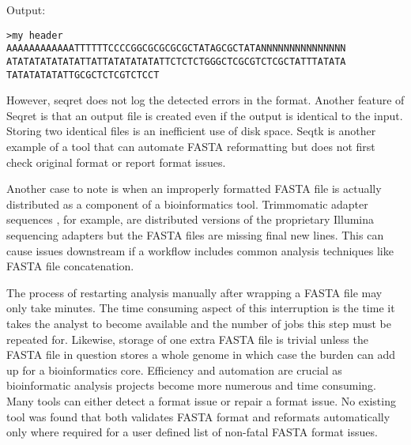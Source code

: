 Output:

\begin{verbatim}
>my header
AAAAAAAAAAAATTTTTTCCCCGGCGCGCGCGCTATAGCGCTATANNNNNNNNNNNNNNN
ATATATATATATATTATTATATATATATTCTCTCTGGGCTCGCGTCTCGCTATTTATATA
TATATATATATTGCGCTCTCGTCTCCT
\end{verbatim}

However, seqret does not log the detected errors in the format. Another feature of Seqret is that an output file is created even if the output is identical to the input. Storing two identical files is an inefficient use of disk space. Seqtk \cite{Li2013} is another example of a tool that can automate FASTA reformatting but does not first check original format or report format issues. 

Another case to note is when an improperly formatted FASTA file is actually distributed as a component of a bioinformatics tool. Trimmomatic adapter sequences \cite{bolger2014trimmomatic}, for example, are distributed versions of the proprietary Illumina sequencing adapters but the FASTA files are missing final new lines. This can cause issues downstream if a workflow includes common analysis techniques like FASTA file concatenation. 

The process of restarting analysis manually after wrapping a FASTA file may only take minutes. The time consuming aspect of this interruption is the time it takes the analyst to become available and the number of jobs this step must be repeated for. Likewise, storage of one extra FASTA file is trivial unless the FASTA file in question stores a whole genome in which case the burden can add up for a bioinformatics core. Efficiency and automation are crucial as bioinformatic analysis projects become more numerous and time consuming. Many tools can either detect a format issue or repair a format issue. No existing tool was found that both validates FASTA format and reformats automatically only where required for a user defined list of non-fatal FASTA format issues.
  